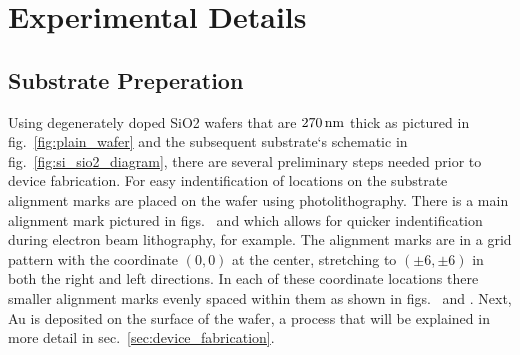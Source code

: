 \chapter{Experimental Details}\label{chap:exp_details}

\section{Substrate Preperation}\label{sec:sample_prep}
Using degenerately doped \ac{SiO2} wafers that are $270\,\mathrm{nm}$ thick as pictured in fig.~\ref{fig:plain_wafer} and the subsequent substrate`s schematic in fig.~\ref{fig:si_sio2_diagram}, there are several preliminary steps needed prior to device fabrication. For easy indentification of locations on the substrate alignment marks are placed on the wafer using photolithography. There is a main alignment mark pictured in figs.~ and  which allows for quicker indentification during electron beam lithography, for example. The alignment marks are in a grid pattern with the coordinate $\left(0,0\right)$ at the center, stretching to $\left(\pm 6,\pm 6\right)$ in both the right and left directions. In each of these coordinate locations there smaller alignment marks evenly spaced within them as shown in figs.~ and . Next, \ac{Au} is deposited on the surface of the wafer, a process that will be explained in more detail in sec.~\ref{sec:device_fabrication}.
